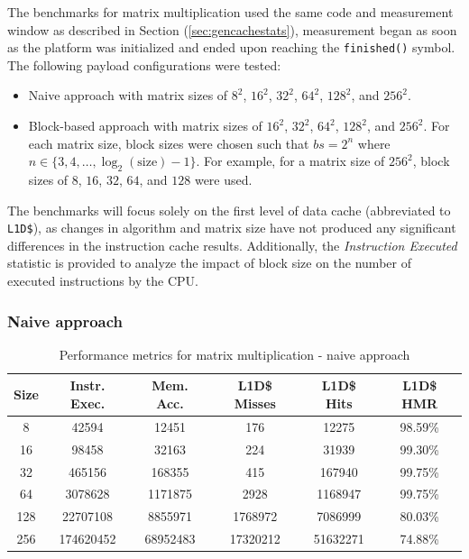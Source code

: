 The benchmarks for matrix multiplication used the same code and measurement window as described in Section (\ref{sec:gencachestats}), measurement began as soon
as the platform was initialized and ended upon reaching the \texttt{finished()} symbol.
The following payload configurations were tested:
\begin{itemize}
	\item Naive approach with matrix sizes of $8^2$, $16^2$, $32^2$, $64^2$, $128^2$, and $256^2$.
	\item Block-based approach with matrix sizes of $16^2$, $32^2$, $64^2$, $128^2$, and $256^2$. For each matrix size, block sizes were chosen such that $bs = 2^n$ where
		$n \in \{3, 4, \ldots, \log_2(\text{size}) - 1\}$. For example, for a matrix size of $256^2$, block sizes of $8$, $16$, $32$, $64$, and $128$ were used.
\end{itemize}

\noindent The benchmarks will focus solely on the first level of data cache (abbreviated to \texttt{L1D\$}), as changes in algorithm and matrix size have not produced any
significant differences in the instruction cache results. Additionally, the \textit{Instruction Executed} statistic is provided to analyze the impact of block size on the number of
executed instructions by the CPU.

\subsubsection{Naive approach}

\begin{center}
\begin{table}[h!]
\centering
\begin{tabular}{|c|c|c|c|c|c|}
\hline
\textbf{Size} & \textbf{Instr. Exec.} & \textbf{Mem. Acc.} & \textbf{L1D\$ Misses} & \textbf{L1D\$ Hits} & \textbf{L1D\$ HMR} \\ \hline
8 & 42594 & 12451 & 176 & 12275 & 98.59\% \\ \hline
16 & 98458 & 32163 & 224 & 31939 & 99.30\% \\ \hline
32 & 465156 & 168355 & 415 & 167940 & 99.75\% \\ \hline
64 & 3078628 & 1171875 & 2928 & 1168947 & 99.75\% \\ \hline
128 & 22707108 & 8855971 & 1768972 & 7086999 & 80.03\% \\ \hline
256 & 174620452 & 68952483 & 17320212 & 51632271 & 74.88\% \\ \hline
\end{tabular}
\caption{Performance metrics for matrix multiplication - naive approach}
\label{tab:performance_metrics}
\end{table}
\end{center}


